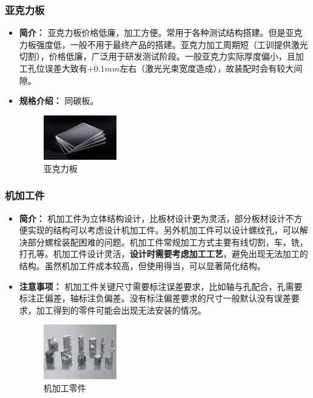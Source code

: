 \documentclass[UTF8]{article} %
\begin{document}
\subsubsection{亚克力板}

\begin{itemize}
  \item \textbf{简介：} 亚克力板价格低廉，加工方便。常用于各种测试结构搭建。但是亚克力板强度低，一般不用于最终产品的搭建。亚克力加工周期短（工训提供激光切割），价格低廉，广泛用于研发测试阶段。一般亚克力实际厚度偏小，且加工孔位误差大致有$+0.1mm$左右（激光光束宽度造成），故装配时会有较大间隙。
  \item \textbf{规格介绍：} 同碳板。
  
  \begin{figure}[h]
    \centering
    \includegraphics[width=0.3\textwidth]{ban3.png}
    \caption{亚克力板}
  \end{figure}

\end{itemize}

\subsubsection{机加工件}

\begin{itemize}
  \item \textbf{简介：} 机加工件为立体结构设计，比板材设计更为灵活，部分板材设计不方便实现的结构可以考虑设计机加工件。另外机加工件可以设计螺纹孔，可以解决部分螺栓装配困难的问题。机加工件常规加工方式主要有线切割，车，铣，打孔等。机加工件设计灵活，\textbf{设计时需要考虑加工工艺}，避免出现无法加工的结构。虽然机加工件成本较高，但使用得当，可以显著简化结构。

  \item \textbf{注意事项：} 机加工件关键尺寸需要标注误差要求，比如轴与孔配合，孔需要标注正偏差，轴标注负偏差。没有标注偏差要求的尺寸一般默认没有误差要求，加工得到的零件可能会出现无法安装的情况。

  
  \begin{figure}[h]
    \centering
    \includegraphics[width=0.3\textwidth]{ji.png}
    \caption{机加工零件}
  \end{figure}

\end{itemize}
\end{document}
